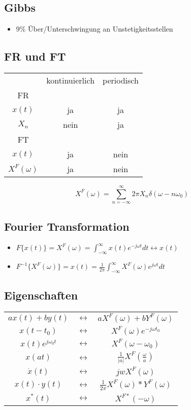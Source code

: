 \documentclass{article}
\begin{document}
\subsection{Gibbs}
\begin{itemize}
\item 9\% Über/Unterschwingung an Unstetigkeitsstellen
\end{itemize}

\subsection{FR und FT}
\begin{tabular}{ c| c| c }
& kontinuierlich & periodisch \\
FR & & \\ \hline
$x(t)$ & ja & ja \\
 $X_n$ &nein& ja\\
 FT & & \\ \hline
 $x(t)$ & ja & nein \\
 $X^F(\omega)$ & ja & nein \\
\end{tabular}
$$X^F(\omega) = \sum_{n=-\infty}^\infty 2\pi X_n \delta(\omega-n\omega_0)$$
\subsection{Fourier Transformation}
\begin{itemize}
\item $F\{x(t)\} = X^F(\omega) = \int_{-\infty}^\infty x(t) e^{-j\omega t} dt \leftrightarrow x(t)$
\item $F^{-1}\{X^F(\omega)\} = x(t) = \frac{1}{2\pi}\int_{-\infty}^\infty X^F(\omega) e^{j\omega t}dt$
\end{itemize}

\subsection{Eigenschaften}
\begin{tabular}{c c c}
$ax(t)+by(t)$ & $\leftrightarrow$ & $aX^F(\omega)+bY^F(\omega)$\\
$x(t-t_0)$ & $\leftrightarrow$ & $X^F(\omega)e^{-j\omega t_0}$\\
$x(t)e^{j\omega_0t}$ & $\leftrightarrow$ & $X^F(\omega-\omega_0)$\\
$x(at)$ & $\leftrightarrow$ & $\frac{1}{|a|}X^F(\frac{\omega}{a})$\\
$\dot{x}(t)$ & $\leftrightarrow$ & $ jw X^F(\omega)$\\
$x(t)\cdot y(t)$ & $\leftrightarrow$ & $\frac{1}{2\pi}X^F(\omega)*Y^F(\omega)$\\
$x^*(t)$ & $\leftrightarrow$ & $X^{F*}(-\omega)$\\
\end{tabular}
\end{document}

